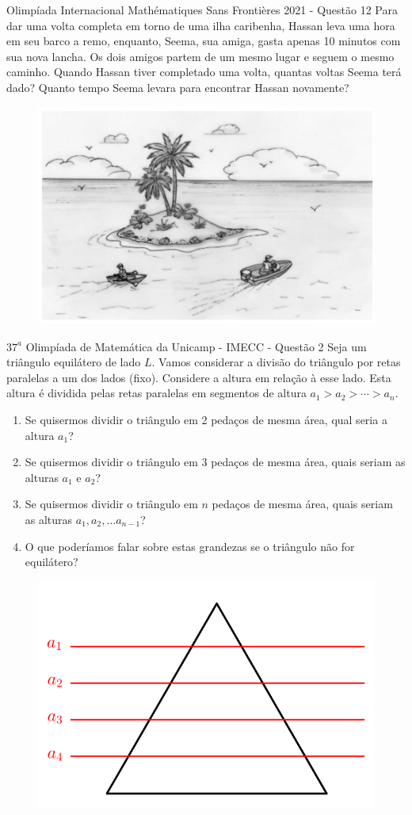 \documentclass[10pt,aspectratio=169]{beamer}
\begin{document}
\begin{frame}[t]
	\begin{exercicio}{Olimpíada Internacional Mathématiques Sans Frontières 2021 - Questão 12}
		Para dar uma volta completa em torno de uma ilha caribenha, Hassan leva uma hora em seu barco a remo, enquanto, Seema, sua amiga, gasta apenas 10 minutos com sua nova lancha.
		Os dois amigos partem de um mesmo lugar e seguem o mesmo caminho.
		Quando Hassan tiver completado uma volta, quantas voltas Seema terá dado?
		Quanto tempo Seema levara para encontrar Hassan novamente?
	\end{exercicio}
	\begin{figure}
		\centering
		\includegraphics[width=0.55\linewidth]{figuras/MSFQ12}
	\end{figure}
\end{frame}

\begin{frame}[t]
	\begin{exercicio}{$ 37^{a} $ Olimpíada de Matemática da Unicamp - IMECC - Questão 2}
		Seja um triângulo equilátero de lado $L$.
		Vamos considerar a divisão do triângulo por retas paralelas a um dos lados (fixo).
		Considere a altura em relação à esse lado.
		Esta altura é dividida pelas retas paralelas em segmentos de altura $a_1>a_2>\cdots>a_n$.
		\begin{enumerate}[a]
			\item Se quisermos dividir o triângulo em 2 pedaços de mesma área, qual seria a altura $ a_1 $?
			\item Se quisermos dividir o triângulo em 3 pedaços de mesma área, quais seriam as alturas $a_1$ e $a_2$?
			\item Se quisermos dividir o triângulo em $ n $ pedaços de mesma área, quais seriam as alturas $a_1,a_2,\ldots a_{n-1}$?
			\item O que poderíamos falar sobre estas grandezas se o triângulo não for equilátero?
		\end{enumerate}
	\end{exercicio}
	\begin{figure}
		\centering
		\includegraphics[width=0.3\linewidth]{figuras/OMUQ2}
	\end{figure}
\end{frame}
\end{document}
